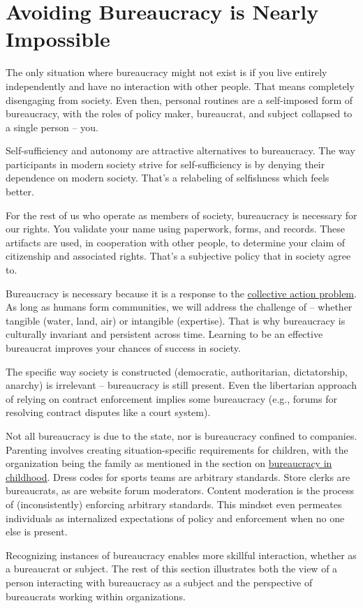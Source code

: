 

\section{Avoiding Bureaucracy is Nearly Impossible}

The only situation where bureaucracy might not exist is if you live entirely independently and have no interaction with other people. That means completely disengaging from society. Even then, personal routines are a self-imposed form of bureaucracy, with the roles of policy maker, bureaucrat, and subject collapsed to a single person -- you.

Self-sufficiency and autonomy are attractive alternatives to bureaucracy. The way participants in modern society strive for self-sufficiency is by denying their dependence on modern society. That's a relabeling of selfishness which feels better. 

For the rest of us who operate as members of  society, bureaucracy is necessary for our rights. You validate your name using paperwork, forms, and records. These artifacts are used, in cooperation with other people, to determine your claim of citizenship and associated rights. 
That's a subjective policy that \iftoggle{glossarysubstitutionworks}{\glspl{stakeholder}}{stakeholders} in society agree to. 


Bureaucracy is necessary because it is a response to the \iftoggle{WPinmargin}{\marginpar{[Wikipedia] Collective\\action problem}}{}
\href{https://en.wikipedia.org/wiki/Collective_action_problem}{collective action problem}. 
As long as humans form communities, we will address the challenge of \iftoggle{glossarysubstitutionworks}{\glspl{shared resource}}{shared resources}
 -- whether tangible (water, land, air) or intangible (expertise). 
That is why bureaucracy is culturally invariant and persistent across time.
Learning to be an effective bureaucrat improves your chances of success in society. 

The specific way society is constructed (democratic, authoritarian, dictatorship, anarchy) is irrelevant -- bureaucracy is still present. Even the libertarian approach of relying on contract enforcement implies some bureaucracy (e.g., forums for resolving contract disputes like a court system). 


Not all bureaucracy is due to the state, nor is bureaucracy confined to companies. Parenting involves creating situation-specific requirements for children, with the organization being the family as mentioned in the section 
on \hyperref[sec:bureaucracy-early-childhood]{bureaucracy in childhood}.
Dress codes for sports teams are arbitrary standards. 
Store clerks are bureaucrats, as are website forum moderators.  Content moderation is the process of (inconsistently) enforcing arbitrary standards. This mindset even permeates individuals as internalized expectations of policy and enforcement when no one else is present. 

Recognizing instances of bureaucracy enables more skillful interaction, whether as a bureaucrat or subject. The rest of this section illustrates both the view of a person interacting with bureaucracy as a \gls{subject} and the perspective of bureaucrats working within organizations. 




